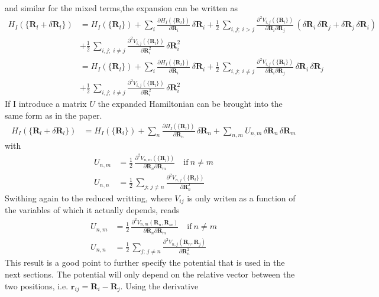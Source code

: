 and similar for the mixed terms,the expansion can be written as
\begin{align*}
    H_I(\{\mathbf{R}_l+\delta\mathbf{R}_l\})&=H_I(\{\mathbf{R}_l\})+\sum_i\frac{\partial H_I(\{\mathbf{R}_l\})}{\partial \mathbf{R}_i}\,\delta\mathbf{R}_i + \frac12\, \sum_{i,j;\;i> j}\frac{\partial^2 V_{i,j}(\{\mathbf{R}_l\})}{\partial \mathbf{R}_i\partial\mathbf{R}_j}\, \left(\delta\mathbf{R}_i\,\delta\mathbf{R}_j+\delta\mathbf{R}_j\,\delta\mathbf{R}_i\right) \\
    &+\frac12\,\sum_{i,j;\;i\neq j}\frac{\partial^2 V_{i,j}(\{\mathbf{R}_l\})}{\partial \mathbf{R}_i^2}\,\delta\mathbf{R}_i^2\\
    &=H_I(\{\mathbf{R}_l\})+\sum_i\frac{\partial H_I(\{\mathbf{R}_l\})}{\partial \mathbf{R}_i}\,\delta\mathbf{R}_i + \frac12\, \sum_{i,j;\;i\neq j}\frac{\partial^2 V_{i,j}(\{\mathbf{R}_l\})}{\partial \mathbf{R}_i\partial\mathbf{R}_j}\,\delta\mathbf{R}_i\,\delta\mathbf{R}_j \\
    &+\frac12\,\sum_{i,j;\;i\neq j}\frac{\partial^2 V_{i,j}(\{\mathbf{R}_l\})}{\partial \mathbf{R}_i^2}\,\delta\mathbf{R}_i^2
\end{align*}
If I introduce a matrix $U$ the expanded Hamiltonian can be brought into the same form as in the paper.
\begin{align*}
    H_I(\{\mathbf{R}_l+\delta\mathbf{R}_l\})&=H_I(\{\mathbf{R}_l\})+\sum_n\frac{\partial H_I(\{\mathbf{R}_l\})}{\partial \mathbf{R}_n}\,\delta\mathbf{R}_n + \sum_{n,m}U_{n,m}\,\delta\mathbf{R}_n\,\delta\mathbf{R}_m
\end{align*}
with
\begin{align*}
    U_{n,m}&=
        \frac12\,\frac{\partial^2 V_{n,m}(\{\mathbf{R}_l\})}{\partial \mathbf{R}_n\partial\mathbf{R}_m}\quad\text{if}\:n\neq m\\
    U_{n,n} &= \frac12\,\sum_{j;\,j\neq n}\frac{\partial^2 V_{n,j}(\{\mathbf{R}_l\})}{\partial \mathbf{R}_n^2}
\end{align*}
Swithing again to the reduced writting, where $V_{ij}$ is only writen as a function of the variables of which it actually depends, reads
\begin{align*}
    U_{n,m}&=
        \frac12\,\frac{\partial^2 V_{n,m}(\mathbf{R}_n,\mathbf{R}_m)}{\partial \mathbf{R}_n\partial\mathbf{R}_m}\quad\text{if}\:n\neq m\\
    U_{n,n} &= \frac12\,\sum_{j;\,j\neq n}\frac{\partial^2 V_{n,j}(\mathbf{R}_n,\mathbf{R}_j)}{\partial \mathbf{R}_n^2}
\end{align*}
This result is a good point to further specify the potential that is used in the next sections. The potential will only depend on the relative vector between the two positions, i.e. $\mathbf{r}_{ij}=\mathbf{R}_i-\mathbf{R}_j$. Using the derivative
